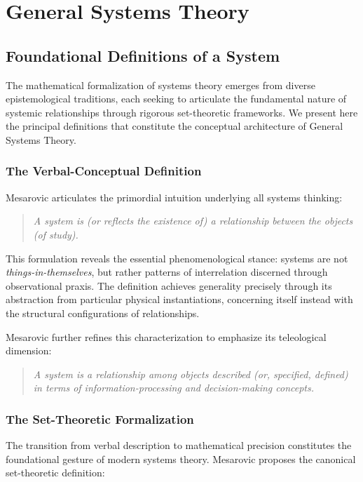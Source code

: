 \section{General Systems Theory}

\subsection{Foundational Definitions of a System}

The mathematical formalization of systems theory emerges from diverse epistemological traditions, each seeking to articulate the fundamental nature of systemic relationships through rigorous set-theoretic frameworks. We present here the principal definitions that constitute the conceptual architecture of General Systems Theory.

\subsubsection{The Verbal-Conceptual Definition}

Mesarovic \citep{mesarovic1972conceptual} articulates the primordial intuition underlying all systems thinking:

\begin{quote}
\emph{A system is (or reflects the existence of) a relationship between the objects (of study).}
\end{quote}

This formulation reveals the essential phenomenological stance: systems are not \emph{things-in-themselves}, but rather patterns of interrelation discerned through observational praxis. The definition achieves generality precisely through its abstraction from particular physical instantiations, concerning itself instead with the structural configurations of relationships.

Mesarovic further refines this characterization to emphasize its teleological dimension:

\begin{quote}
\emph{A system is a relationship among objects described (or, specified, defined) in terms of information-processing and decision-making concepts.}
\end{quote}

\subsubsection{The Set-Theoretic Formalization}

The transition from verbal description to mathematical precision constitutes the foundational gesture of modern systems theory. Mesarovic \citep{mesarovic1972conceptual} proposes the canonical set-theoretic definition:

